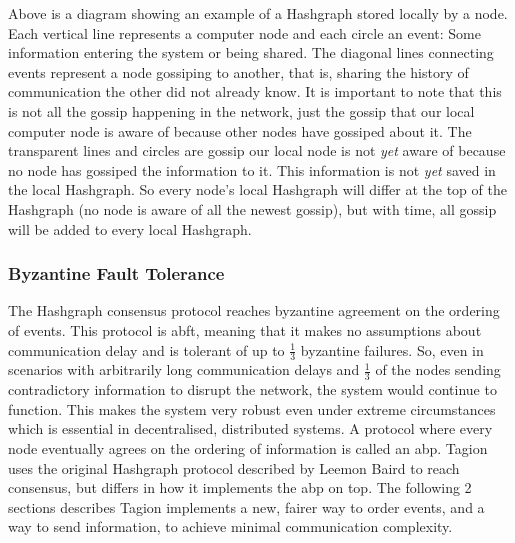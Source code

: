     Above is a diagram showing an example of a Hashgraph stored locally by a node. Each vertical line represents a computer node and each circle an event: Some information entering the system or being shared. The diagonal lines connecting events represent a node gossiping to another, that is, sharing the history of communication the other did not already know. It is important to note that this is not all the gossip happening in the network, just the gossip that our local computer node is aware of because other nodes have gossiped about it. The transparent lines and circles are gossip our local node is not \textit{yet} aware of because no node has gossiped the information to it. This information is not \textit{yet} saved in the local Hashgraph. So every node's local Hashgraph will differ at the top of the Hashgraph (no node is aware of all the newest gossip), but with time, all gossip will be added to every local Hashgraph.

\subsubsection{Byzantine Fault Tolerance}
    The Hashgraph consensus protocol reaches byzantine agreement on the ordering of events. This protocol is \gls{abft}, meaning that it makes no assumptions about communication delay and is tolerant of up to $\frac{1}{3}$ byzantine failures. So, even in scenarios with arbitrarily long communication delays and $\frac{1}{3}$ of the nodes sending contradictory information to disrupt the network, the system would continue to function. This makes the system very robust even under extreme circumstances which is essential in decentralised, distributed systems. A protocol where every node eventually agrees on the ordering of information is called an \acrfull{abp}. Tagion uses the original Hashgraph protocol described by Leemon Baird to reach consensus, but differs in how it implements the \gls{abp} on top. The following 2 sections describes Tagion implements a new, fairer way to order events, and a way to send information, to achieve minimal communication complexity. 

